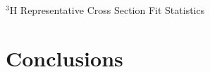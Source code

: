 \documentclass[10pt]{beamer}
\begin{document}
\begin{frame}[fragile]{$^3$H Representative Cross Section Fit Statistics}

\end{frame}

\section{Conclusions}
\end{document}
